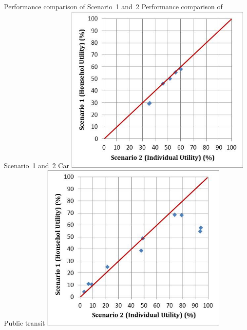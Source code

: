\createfigure%
{Performance comparison of Scenario~1 and~2}%
{Performance comparison of Scenario~1 and~2}%
{\label{fig:baoding_fig2}}%
{%
  \createsubfigure%
  {Car}%
  {\includegraphics[width=0.7\textwidth,angle=0]{scenarios/figures/baoding_fig2a.png}}%
  {\label{fig:baoding_fig2a}}%
  {}%
  \createsubfigure%
  {Public transit}%
	{\includegraphics[width=0.7\textwidth,angle=0]{scenarios/figures/baoding_fig2b.png}}%
  {\label{fig:baoding_fig2b}}%
  {}%
}%
{}

